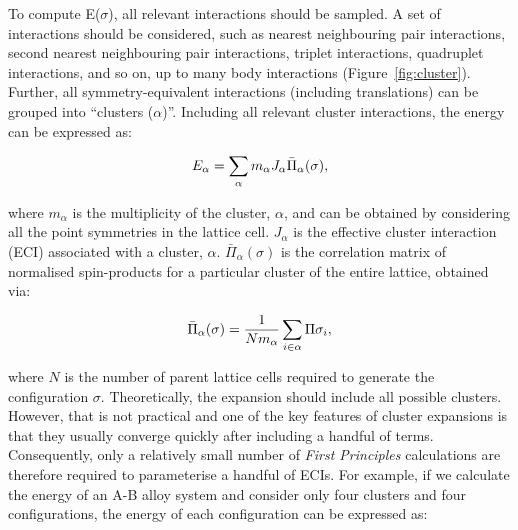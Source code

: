 \documentclass[../main.tex]{subfiles}
\begin{document}
To compute E($\sigma$), all relevant interactions should be sampled. A set of interactions should be considered, such as nearest neighbouring pair interactions, second nearest neighbouring pair interactions, triplet interactions, quadruplet interactions, and so on, up to many body interactions (Figure~\ref{fig:cluster}). Further, all symmetry-equivalent interactions (including translations) can be grouped into ``clusters ($\alpha$)''. Including all relevant cluster interactions, the energy can be expressed as:

\begin{equation}
    \centering
    {E}_{\alpha}=\sum_\alpha {m_\alpha}{J_\alpha}{\bar{\Pi}_\alpha(\sigma)},
    \label{eq:clusters}
\end{equation} 

where $m_\alpha$ is the multiplicity of the cluster, $\alpha$, and can be obtained by considering all the point symmetries in the lattice cell. $J_\alpha$ is the effective cluster interaction (ECI) associated with a cluster, $\alpha$. $\bar{\Pi}_\alpha(\sigma)$ is the correlation matrix of normalised spin-products for a particular cluster of the entire lattice, obtained via:

\begin{equation}
    \centering
    {\bar{\Pi}_\alpha(\sigma)}=\frac{1}{N{m_\alpha}}\sum_{i\in\alpha} {\Pi{\sigma_i}},
    \label{eq:correlation_matrix}
\end{equation} 

where $N$ is the number of parent lattice cells required to generate the configuration $\sigma$. Theoretically, the expansion should include all possible clusters. However, that is not practical and one of the key features of cluster expansions is that they usually converge quickly after including a handful of terms.\cite{VanderVen2001} Consequently, only a relatively small number of \textit{First Principles} calculations are therefore required to parameterise a handful of ECIs. For example, if we calculate the energy of an A-B alloy system and consider only four clusters and four configurations, the energy of each configuration can be expressed as:
\end{document}
